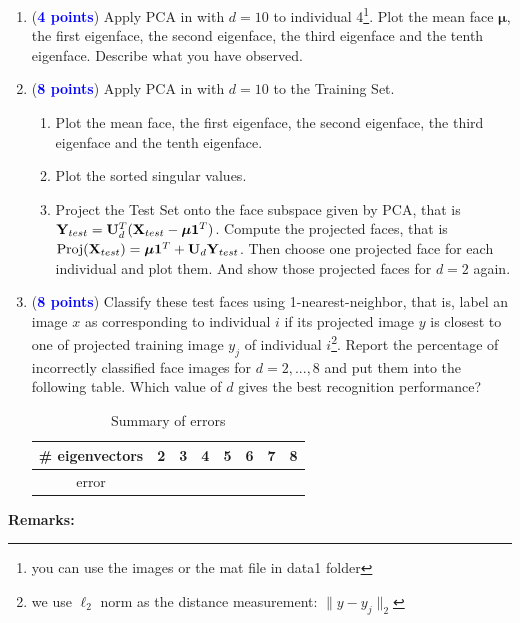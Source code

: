\documentclass[english,onecolumn]{IEEEtran}
\newcommand{\bY}{{\bf Y}}
\newcommand{\bX}{{\bf X}}
\newcommand{\bmu}{{\boldsymbol \mu}}
\newcommand{\bone}{{\boldsymbol 1}}
\newcommand{\bU}{{\bf U}}
\begin{document}
\begin{enumerate}
    \item (\textcolor{blue}{\textbf{4 points}}) Apply PCA in  with $d = 10$ to individual 4\footnote{you can use the images or the mat file in data1 folder}. Plot the mean face $\bmu$, the first eigenface, the second eigenface, the third eigenface and the tenth eigenface. Describe what you have observed.
    \item (\textcolor{blue}{\textbf{8 points}}) Apply PCA in  with $d = 10$ to the Training Set. 
    \begin{enumerate}
        \item Plot the mean face, the first eigenface, the second eigenface, the third eigenface and the tenth eigenface.
        \item Plot the sorted singular values.
        \item Project the Test Set onto the face subspace given by PCA, that is $\bY_{test} = \bU_d^T(\bX_{test}-\bmu \bone^T)$. Compute the projected faces, that is $\text{Proj}(\bX_{test}) = \bmu \bone^T + \bU_d\bY_{test}$. Then choose one projected face for each individual and plot them. And show those projected faces for $d = 2$ again.
    \end{enumerate} 
    \item (\textcolor{blue}{\textbf{8 points}}) Classify these test faces using 1-nearest-neighbor, that is, label an image $x$ as corresponding to individual $i$ if its projected image $y$ is closest to one of projected training image $y_j$ of individual $i$\footnote{we use $\ell_2$ norm as the distance measurement: $ \|y-y_j\|_2$}. Report the percentage of incorrectly classified face images for $d = 2,...,8$ and put them into the following table. Which value of $d$ gives the best recognition performance?
    \begin{table}[h]
        \centering
        \caption{Summary of errors}
        \begin{tabular}{c|c|c|c|c|c|c|c}
        \# eigenvectors& 2 & 3& 4 & 5 & 6 & 7 & 8 \\ 
        \hline
            error &  &  &  &  &  &  &  
        \end{tabular}
        \label{tab:my_label}
    \end{table}
\end{enumerate}
{\bf Remarks:}
\end{document}
